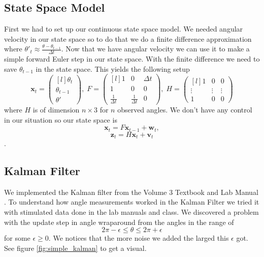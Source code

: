 \documentclass[11pt]{amsart}
\begin{document}
\subsection{State Space Model}
First we had to set up our continuous state space model. We needed angular velocity in our state space so to do that we do a finite difference approximation 
where $\theta'_t \approx \frac{\theta - \theta_{t-1}}{\Delta t}$. Now that we have angular velocity we can use it to make a simple forward Euler step in our state 
space. With the finite difference we need to save $\theta_{t-1}$ in the state space. This yields the following setup
\[\mathbf{x}_t = \begin{pmatrix*}[l]
    \theta_t \\
    \theta_{t-1} \\
    \theta'
\end{pmatrix*},\;  
F = \begin{pmatrix*}[l]
    1 & 0 & \Delta t \\
    1 & 0 & 0 \\
    \frac{1}{\Delta t} & \frac{1}{\Delta t} & 0
\end{pmatrix*},\;
H = \begin{pmatrix*}[l]
    1 & 0 & 0 \\
    \vdots & \vdots & \vdots\\
    1 & 0 & 0

\end{pmatrix*}\]
 where $H$ is of dimension $n\times3$ for $n$ observed angles. We don't have any control in our situation so our state space is
 \[\mathbf{x}_t = F\mathbf{x}_{t-1} + \mathbf{w}_t,\]
\[\mathbf{z}_t = H\mathbf{x}_t + \mathbf{v}_t\].

\subsection{Kalman Filter}
We implemented the Kalman filter from the Volume 3 Textbook \cite{V3} and Lab Manual \cite{V3 Lab Manual}. To understand how angle measurements worked in the Kalman Filter we tried it with
stimulated data done in the lab manuals and class. We discovered a problem with the update step in angle wraparound from the angles in the range of 
\[2\pi - \epsilon \leq \theta \leq 2\pi + \epsilon\] for some $\epsilon \geq 0$. We notices that the more noise we added the larged this $\epsilon$ got. 
See figure \ref{fig:simple_kalman} to get a visual.
\end{document}
